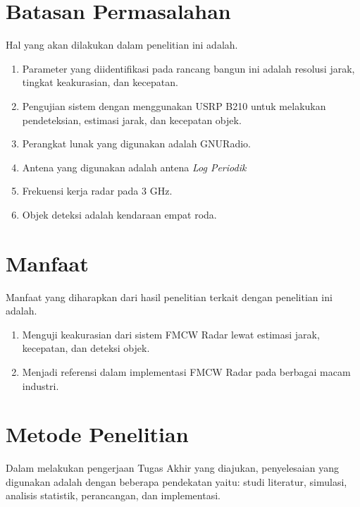 \section{Batasan Permasalahan}
Hal yang akan dilakukan dalam penelitian ini adalah.
\begin{enumerate}
	\item Parameter yang diidentifikasi pada rancang bangun ini adalah resolusi jarak, tingkat keakurasian, dan kecepatan.
	\item Pengujian sistem dengan menggunakan USRP B210 untuk melakukan pendeteksian, estimasi jarak, dan kecepatan objek.
	\item Perangkat lunak yang digunakan adalah GNURadio.
	\item Antena yang digunakan adalah antena \textit{Log Periodik}
	\item Frekuensi kerja radar pada 3 GHz.
	\item Objek deteksi adalah kendaraan empat roda.
\end{enumerate}

\section{Manfaat}
Manfaat yang diharapkan dari hasil penelitian terkait dengan penelitian ini adalah. 
\begin{enumerate}
	\item Menguji keakurasian dari sistem FMCW Radar lewat estimasi jarak, kecepatan, dan deteksi objek.
	\item Menjadi referensi dalam implementasi FMCW Radar pada berbagai macam industri.
\end{enumerate}

\section{Metode Penelitian}
Dalam melakukan pengerjaan Tugas Akhir yang diajukan, penyelesaian yang digunakan adalah dengan beberapa pendekatan yaitu: studi literatur, simulasi, analisis statistik, perancangan, dan implementasi.

